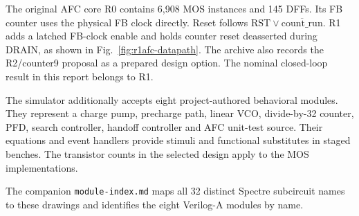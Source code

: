 The original AFC core R0 contains 6,908 MOS instances and 145 DFFs.
Its FB counter uses the physical FB clock directly. Reset follows
$\mathrm{RST}\lor\overline{\mathrm{count\_run}}$. R1 adds a latched
FB-clock enable and holds counter reset deasserted during DRAIN,
as shown in Fig.~\ref{fig:r1afc-datapath}. The archive also records
the R2/counter9 proposal as a prepared design option. The nominal
closed-loop result in this report belongs to R1.

The simulator additionally accepts eight project-authored behavioral
modules. They represent a charge pump, precharge path, linear VCO,
divide-by-32 counter, PFD, search controller, handoff controller and
AFC unit-test source. Their equations and event handlers provide stimuli
and functional substitutes in staged benches. The transistor counts in
the selected design apply to the MOS implementations.

The companion \texttt{module-index.md} maps all 32 distinct Spectre
subcircuit names to these drawings and identifies the eight Verilog-A
modules by name.
